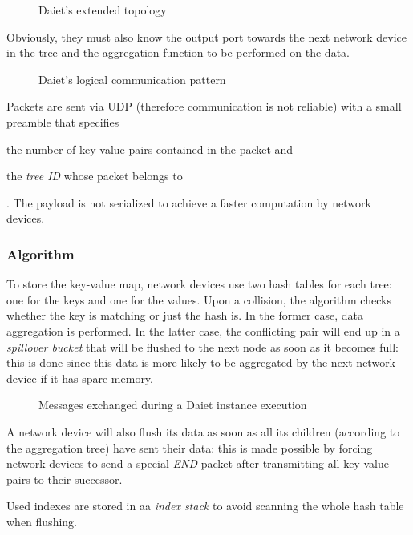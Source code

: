\begin{figure}[!htb]
    \centering
    \usebox{\daietextended}
    \caption{Daiet's \texorpdfstring{\cite{daiet}}{} extended topology}
\end{figure}

Obviously, they must also know the output port towards the next network device in the tree and the aggregation function to be performed on the data.

\begin{figure}[!htb]
    \centering
    \usebox{\daietcommunication}
    \caption{Daiet's \texorpdfstring{\cite{daiet}}{} logical communication pattern}
\end{figure}

Packets are sent via UDP (therefore communication is not reliable) with a small preamble that specifies
\begin{mylist}
    \item the number of key-value pairs contained in the packet and
    \item the \textit{tree ID} whose packet belongs to
\end{mylist}.
The payload is not serialized to achieve a faster computation by network devices.

\subsubsection{Algorithm} \label{daiet_algorithm}
To store the key-value map, network devices use two hash tables for each tree: one for the keys and one for the values.
Upon a collision, the algorithm checks whether the key is matching or just the hash is.
In the former case, data aggregation is performed.
In the latter case, the conflicting pair will end up in a \textit{spillover bucket} that will be flushed to the next node as soon as it becomes full: this is done since this data is more likely to be aggregated by the next network device if it has spare memory.

\begin{figure}[!htb]
    \centering
    \usebox{\daietsd}
    \caption{Messages exchanged during a Daiet \texorpdfstring{\cite{daiet}}{} instance execution}
\end{figure}

A network device will also flush its data as soon as all its children (according to the aggregation tree) have sent their data: this is made possible by forcing network devices to send a special \textit{END} packet after transmitting all key-value pairs to their successor.\par
Used indexes are stored in aa \textit{index stack} to avoid scanning the whole hash table when flushing.

